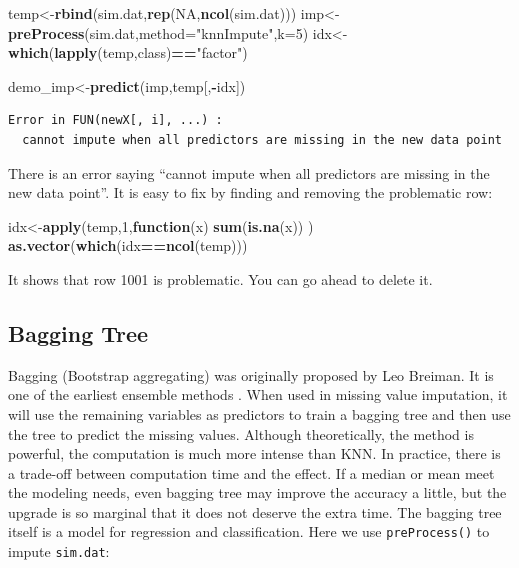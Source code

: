 \documentclass[12pt,]{krantz}
\makeatletter
\newenvironment{Shaded}{\begin{snugshade}}{\end{snugshade}}
\newcommand{\KeywordTok}[1]{\textcolor[rgb]{0.27,0.27,0.27}{\textbf{#1}}}
\newcommand{\DataTypeTok}[1]{\textcolor[rgb]{0.27,0.27,0.27}{#1}}
\newcommand{\DecValTok}[1]{\textcolor[rgb]{0.06,0.06,0.06}{#1}}
\newcommand{\StringTok}[1]{\textcolor[rgb]{0.5,0.5,0.5}{#1}}
\newcommand{\OtherTok}[1]{\textcolor[rgb]{0.37,0.37,0.37}{#1}}
\newcommand{\ControlFlowTok}[1]{\textcolor[rgb]{0.27,0.27,0.27}{\textbf{#1}}}
\newcommand{\OperatorTok}[1]{\textcolor[rgb]{0.43,0.43,0.43}{\textbf{#1}}}
\newcommand{\NormalTok}[1]{#1}
\newenvironment{kframe}{%
\medskip{}
\setlength{\fboxsep}{.8em}
 \def\at@end@of@kframe{}%
 \ifinner\ifhmode%
  \def\at@end@of@kframe{\end{minipage}}%
  \begin{minipage}{\columnwidth}%
 \fi\fi%
 \def\FrameCommand##1{\hskip\@totalleftmargin \hskip-\fboxsep
 \colorbox{shadecolor}{##1}\hskip-\fboxsep
     \hskip-\linewidth \hskip-\@totalleftmargin \hskip\columnwidth}%
 \MakeFramed {\advance\hsize-\width
   \@totalleftmargin\z@ \linewidth\hsize
   \@setminipage}}%
 {\par\unskip\endMakeFramed%
 \at@end@of@kframe}
\renewenvironment{Shaded}{\begin{kframe}}{\end{kframe}}
\theoremstyle{definition}
\theoremstyle{definition}
\theoremstyle{definition}
\theoremstyle{remark}
\makeatother
\begin{document}
\begin{Shaded}
\begin{Highlighting}[]
\NormalTok{temp<-}\KeywordTok{rbind}\NormalTok{(sim.dat,}\KeywordTok{rep}\NormalTok{(}\OtherTok{NA}\NormalTok{,}\KeywordTok{ncol}\NormalTok{(sim.dat)))}
\NormalTok{imp<-}\KeywordTok{preProcess}\NormalTok{(sim.dat,}\DataTypeTok{method=}\StringTok{"knnImpute"}\NormalTok{,}\DataTypeTok{k=}\DecValTok{5}\NormalTok{)}
\NormalTok{idx<-}\KeywordTok{which}\NormalTok{(}\KeywordTok{lapply}\NormalTok{(temp,class)}\OperatorTok{==}\StringTok{"factor"}\NormalTok{)}
\end{Highlighting}
\end{Shaded}

\begin{Shaded}
\begin{Highlighting}[]
\NormalTok{demo_imp<-}\KeywordTok{predict}\NormalTok{(imp,temp[,}\OperatorTok{-}\NormalTok{idx])}
\end{Highlighting}
\end{Shaded}

\begin{verbatim}
Error in FUN(newX[, i], ...) : 
  cannot impute when all predictors are missing in the new data point
\end{verbatim}

There is an error saying ``cannot impute when all predictors are missing
in the new data point''. It is easy to fix by finding and removing the
problematic row:

\begin{Shaded}
\begin{Highlighting}[]
\NormalTok{idx<-}\KeywordTok{apply}\NormalTok{(temp,}\DecValTok{1}\NormalTok{,}\ControlFlowTok{function}\NormalTok{(x) }\KeywordTok{sum}\NormalTok{(}\KeywordTok{is.na}\NormalTok{(x)) )}
\KeywordTok{as.vector}\NormalTok{(}\KeywordTok{which}\NormalTok{(idx}\OperatorTok{==}\KeywordTok{ncol}\NormalTok{(temp)))}
\end{Highlighting}
\end{Shaded}

It shows that row 1001 is problematic. You can go ahead to delete it.

\subsection{Bagging Tree}\label{bagging-tree}

Bagging (Bootstrap aggregating) was originally proposed by Leo Breiman.
It is one of the earliest ensemble methods \citep{bag1}. When used in
missing value imputation, it will use the remaining variables as
predictors to train a bagging tree and then use the tree to predict the
missing values. Although theoretically, the method is powerful, the
computation is much more intense than KNN. In practice, there is a
trade-off between computation time and the effect. If a median or mean
meet the modeling needs, even bagging tree may improve the accuracy a
little, but the upgrade is so marginal that it does not deserve the
extra time. The bagging tree itself is a model for regression and
classification. Here we use \texttt{preProcess()} to impute
\texttt{sim.dat}:
\end{document}
